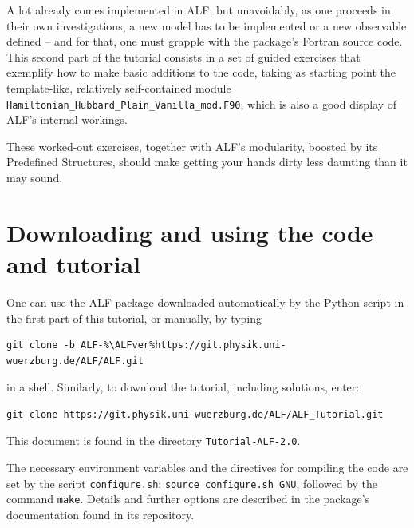 \documentclass[10pt,modern]{scrartcl}
\numberwithin{exerciseitem}{exercise} %
\newcommand{\ALFver}{2.0}    %
\newcommand{\tutALFver}{2.0} %
\begin{document}
A lot already comes implemented in ALF, but unavoidably, as one proceeds in their own investigations, a new model has to be implemented or a new observable defined -- and for that, one must grapple with the package's Fortran source code. 
This second part of the tutorial consists in a set of guided exercises that exemplify how to make basic additions to the code, taking as starting point the template-like, relatively self-contained module \texttt{Hamiltonian\_Hubbard\_Plain\_Vanilla\_mod.F90}, which is also a good display of ALF's internal workings.

These worked-out exercises, together with ALF's modularity, boosted by its Predefined Structures, should make getting your hands dirty less daunting than it may sound.


\section*{Downloading and using the code and tutorial}
One can use the ALF package downloaded automatically by the Python script in the first part of this tutorial, or manually, by typing
\begin{lstlisting}[style=bash,escapechar=\%]
git clone -b ALF-%\ALFver%https://git.physik.uni-wuerzburg.de/ALF/ALF.git
\end{lstlisting}
in a shell. Similarly, to download the tutorial, including solutions, enter:
\begin{lstlisting}[style=bash]
git clone https://git.physik.uni-wuerzburg.de/ALF/ALF_Tutorial.git
\end{lstlisting}
This document is found in the directory \texttt{Tutorial-ALF-\tutALFver{}}.

The necessary environment variables and the directives for compiling the code are set by the script \texttt{configure.sh}: \lstinline[style=bash]|source configure.sh GNU|, followed by the command  \lstinline[style=bash,morekeywords={make}]|make|. Details and further options are described in the package's documentation found in its repository.
\end{document}
